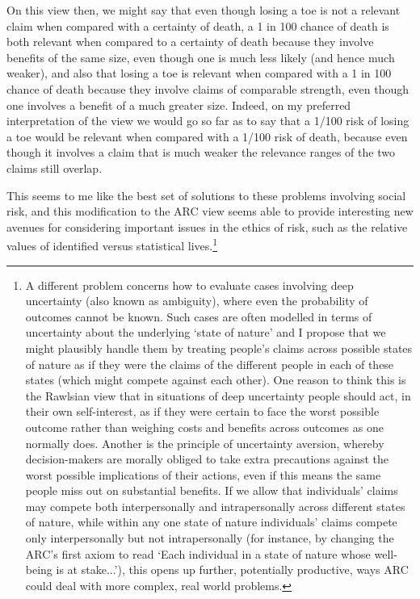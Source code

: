 \documentclass[man,11pt,a4paper]{apa7}
\begin{document}
On this view then, we might say that even though losing a toe is not a relevant claim when compared with a certainty of death, a 1 in 100 chance of death is both relevant when compared to a certainty of death because they involve benefits of the same size, even though one is much less likely (and hence much weaker), and also that losing a toe is relevant when compared with a 1 in 100 chance of death because they involve claims of comparable strength, even though one involves a benefit of a much greater size. Indeed, on my preferred interpretation of the view we would go so far as to say that a 1/100 risk of losing a toe would be relevant when compared with a 1/100 risk of death, because even though it involves a claim that is much weaker the relevance ranges of the two claims still overlap.

This seems to me like the best set of solutions to these problems involving social risk, and this modification to the ARC view seems able to provide interesting new avenues for considering important issues in the ethics of risk, such as the relative values of identified versus statistical lives.\footnote{A different problem concerns how to evaluate cases involving deep uncertainty (also known as ambiguity), where even the probability of outcomes cannot be known. Such cases are often modelled in terms of uncertainty about the underlying `state of nature' and I propose that we might plausibly handle them by treating people's claims across possible states of nature as if they were the claims of the different people in each of these states (which might compete against each other). One reason to think this is the Rawlsian view that in situations of deep uncertainty people should act, in their own self-interest, as if they were certain to face the worst possible outcome rather than weighing costs and benefits across outcomes as one normally does. Another is the principle of uncertainty aversion, whereby decision-makers are morally obliged to take extra precautions against the worst possible implications of their actions, even if this means the same people miss out on substantial benefits. If we allow that individuals' claims may compete both interpersonally and intrapersonally across different states of nature, while within any one state of nature individuals' claims compete only interpersonally but not intrapersonally (for instance, by changing the ARC's first axiom to read `Each individual in a state of nature whose well-being is at stake...'), this opens up further, potentially productive, ways ARC could deal with more complex, real world problems.}
\end{document}

